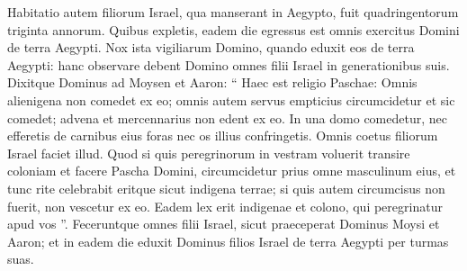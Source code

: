 \begin{biblechapter}
\begin{biblechapter}
\begin{biblechapter}
\begin{biblechapter}
\begin{biblechapter}
\begin{biblechapter}
\begin{biblechapter}
\begin{biblechapter}
\begin{biblechapter}
\begin{biblechapter}
\begin{biblechapter}
\begin{biblechapter}
 \verse Habitatio autem filiorum Israel, qua manserant in Aegypto, fuit quadringentorum triginta annorum. 
\verse Quibus expletis, eadem die egressus est omnis exercitus Domini de terra Aegypti. 
\verse Nox ista vigiliarum Domino, quando eduxit eos de terra Aegypti: hanc observare debent Domino omnes filii Israel in generationibus suis.
 \verse Dixitque Dominus ad Moysen et Aaron: “ Haec est religio Paschae: Omnis alienigena non comedet ex eo; 
\verse omnis autem servus empticius circumcidetur et sic comedet; 
\verse advena et mercennarius non edent ex eo. 
\verse In una domo comedetur, nec efferetis de carnibus eius foras nec os illius confringetis. 
 \verse Omnis coetus filiorum Israel faciet illud. 
\verse Quod si quis peregrinorum in vestram voluerit transire coloniam et facere Pascha Domini, circumcidetur prius omne masculinum eius, et tunc rite celebrabit eritque sicut indigena terrae; si quis autem circumcisus non fuerit, non vescetur ex eo. 
\verse Eadem lex erit indigenae et colono, qui peregrinatur apud vos ”. 
\verse Feceruntque omnes filii Israel, sicut praeceperat Dominus Moysi et Aaron; 
\verse et in eadem die eduxit Dominus filios Israel de terra Aegypti per turmas suas.
 

\end{biblechapter}
\end{biblechapter}
\end{biblechapter}
\end{biblechapter}
\end{biblechapter}
\end{biblechapter}
\end{biblechapter}
\end{biblechapter}
\end{biblechapter}
\end{biblechapter}
\end{biblechapter}
\end{biblechapter}

